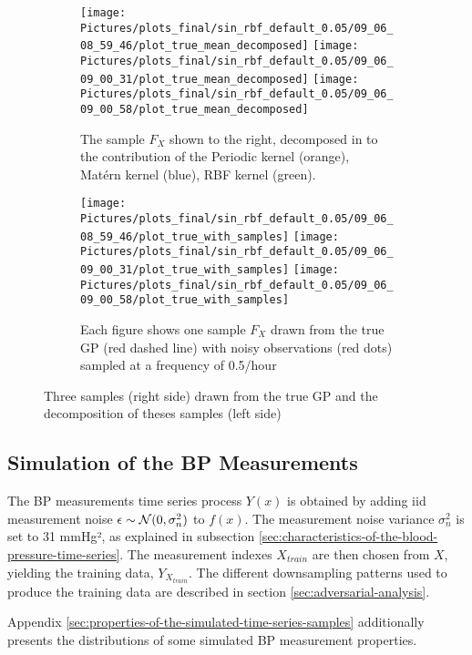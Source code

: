 \begin{figure}[!ht]
\centering
\begin{subfigure}{.45\textwidth}
    \centering
    \texttt{[image: Pictures/plots\_final/sin\_rbf\_default\_0.05/09\_06\_08\_59\_46/plot\_true\_mean\_decomposed]}
    \texttt{[image: Pictures/plots\_final/sin\_rbf\_default\_0.05/09\_06\_09\_00\_31/plot\_true\_mean\_decomposed]}
    \texttt{[image: Pictures/plots\_final/sin\_rbf\_default\_0.05/09\_06\_09\_00\_58/plot\_true\_mean\_decomposed]}
  \caption{The sample $F_X$ shown to the right, decomposed in to the contribution of the Periodic kernel (orange),
      Matérn kernel (blue), RBF kernel (green).}
  \label{fig:true_mean_decomposed}
\end{subfigure}\hfill
\begin{subfigure}{.45\textwidth}
    \centering
    \texttt{[image: Pictures/plots\_final/sin\_rbf\_default\_0.05/09\_06\_08\_59\_46/plot\_true\_with\_samples]}
    \texttt{[image: Pictures/plots\_final/sin\_rbf\_default\_0.05/09\_06\_09\_00\_31/plot\_true\_with\_samples]}
    \texttt{[image: Pictures/plots\_final/sin\_rbf\_default\_0.05/09\_06\_09\_00\_58/plot\_true\_with\_samples]}
  \caption{Each figure shows one sample $F_X$ drawn from the true GP (red dashed line) with noisy observations
      (red dots) sampled at a frequency of 0.5/hour}
  \label{fig:sub2}
\end{subfigure}
\caption{Three samples (right side) drawn from the true GP and the decomposition of theses samples (left side)}
\label{fig:true_gp_samples}
\end{figure}


\subsection{Simulation of the BP Measurements}\label{subsec:simulation-of-the-bp-measurements}

The BP measurements time series process $Y(x)$ is obtained by adding iid measurement noise
$\epsilon \sim \operatorname{\mathcal{N}}(0, \sigma_n^2)$ to $f(x)$.
The measurement noise variance
$\sigma_n^2$ is set to 31 mmHg², as explained in subsection
\ref{sec:characteristics-of-the-blood-pressure-time-series}.
The measurement indexes $X_{train}$ are then chosen
from $X$, yielding the training data, $Y_{X_{train}}$.
The different downsampling patterns used to produce the training data
are described in section \ref{sec:adversarial-analysis}.

Appendix \ref{sec:properties-of-the-simulated-time-series-samples} additionally presents
the distributions of some simulated BP measurement properties.


